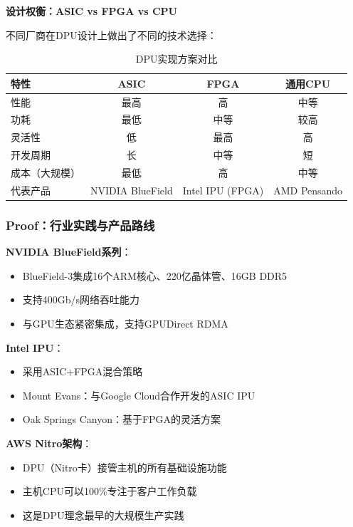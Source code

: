 \textbf{设计权衡：ASIC vs FPGA vs CPU}

不同厂商在DPU设计上做出了不同的技术选择：

\begin{table}[h]
\centering
\caption{DPU实现方案对比}
\begin{tabular}{lccc}
\toprule
\textbf{特性} & \textbf{ASIC} & \textbf{FPGA} & \textbf{通用CPU} \\
\midrule
性能 & 最高 & 高 & 中等 \\
功耗 & 最低 & 中等 & 较高 \\
灵活性 & 低 & 最高 & 高 \\
开发周期 & 长 & 中等 & 短 \\
成本（大规模） & 最低 & 高 & 中等 \\
代表产品 & NVIDIA BlueField & Intel IPU (FPGA) & AMD Pensando \\
\bottomrule
\end{tabular}
\end{table}

\subsubsection{Proof：行业实践与产品路线}

\textbf{NVIDIA BlueField系列}：
\begin{itemize}
    \item BlueField-3集成16个ARM核心、220亿晶体管、16GB DDR5
    \item 支持400Gb/s网络吞吐能力
    \item 与GPU生态紧密集成，支持GPUDirect RDMA
\end{itemize}

\textbf{Intel IPU}：
\begin{itemize}
    \item 采用ASIC+FPGA混合策略
    \item Mount Evans：与Google Cloud合作开发的ASIC IPU
    \item Oak Springs Canyon：基于FPGA的灵活方案
\end{itemize}

\textbf{AWS Nitro架构}：
\begin{itemize}
    \item DPU（Nitro卡）接管主机的所有基础设施功能
    \item 主机CPU可以100\%专注于客户工作负载
    \item 这是DPU理念最早的大规模生产实践
\end{itemize}

